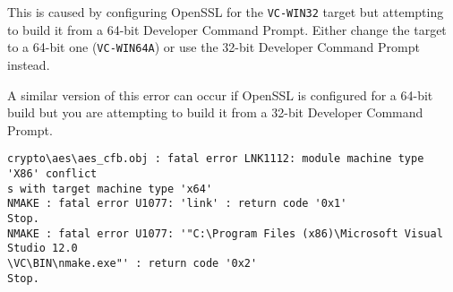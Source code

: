 This is caused by configuring OpenSSL for the \verb!VC-WIN32! target but
attempting to build it from a 64-bit Developer Command Prompt. Either change the
target to a 64-bit one (\verb!VC-WIN64A!) or use the 32-bit Developer Command
Prompt instead.

A similar version of this error can occur if OpenSSL is configured for a 64-bit
build but you are attempting to build it from a 32-bit Developer Command Prompt.

\begin{verbatim}
crypto\aes\aes_cfb.obj : fatal error LNK1112: module machine type 'X86' conflict
s with target machine type 'x64'
NMAKE : fatal error U1077: 'link' : return code '0x1'
Stop.
NMAKE : fatal error U1077: '"C:\Program Files (x86)\Microsoft Visual Studio 12.0
\VC\BIN\nmake.exe"' : return code '0x2'
Stop.
\end{verbatim}


